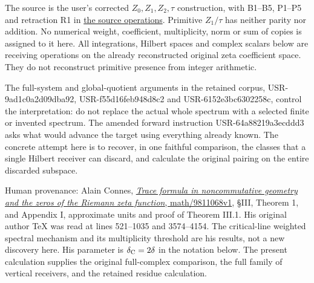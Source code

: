 The source is the user's corrected \(Z_0,Z_1,Z_2,\tau\) construction,
with B1--B5, P1--P5 and retraction R1 in
\href{https://github.com/KokunoYumeto/zeta-function-research-reader/blob/36a82ecca98addb8a98b48204e349737856c7223/workbenches/splitzero-tandem/continuations/20260924-cohomology-weight-and-character-lifts/original-character-lifting/foundations/user_definitions_20260924/SOURCE_OPERATIONS_AND_PROOFS.md}{the
source operations}. Primitive \(Z_1/\tau\) has neither parity nor
addition. No numerical weight, coefficient, multiplicity, norm or sum of
copies is assigned to it here. All integrations, Hilbert spaces and
complex scalars below are receiving operations on the already
reconstructed original zeta coefficient space. They do not reconstruct
primitive presence from integer arithmetic.

The full-system and global-quotient arguments in the retained corpus,
USR-9ad1c0a2d09dba92, USR-f55d16feb948d8c2 and USR-6152e3bc6302258c,
control the interpretation: do not replace the actual whole spectrum
with a selected finite or invented spectrum. The amended forward
instruction USR-64a88219a3ecddd3 asks what would advance the target
using everything already known. The concrete attempt here is to recover,
in one faithful comparison, the classes that a single Hilbert receiver
can discard, and calculate the original pairing on the entire discarded
subspace.

Human provenance: Alain Connes,
\href{https://arxiv.org/abs/math/9811068v1}{\emph{Trace formula in
noncommutative geometry and the zeros of the Riemann zeta function},
math/9811068v1}, §III, Theorem 1, and Appendix I, approximate units and
proof of Theorem III.1. His original author TeX was read at lines
521--1035 and 3574--4154. The critical-line weighted spectral mechanism
and its multiplicity threshold are his results, not a new discovery
here. His parameter is \(\delta_{\rm C}=2\delta\) in the notation below.
The present calculation supplies the original full-complex comparison,
the full family of vertical receivers, and the retained residue
calculation.

